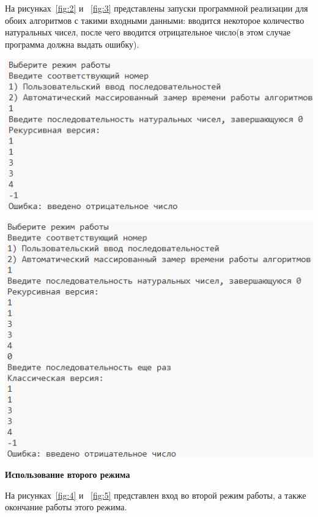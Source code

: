 \documentclass[14pt]{article}
\begin{document}
	На рисунках~\ref{fig:2} и ~\ref{fig:3} представлены запуски программной реализации для обоих алгоритмов с такими входными данными: вводится некоторое количество натуральных чисел, после чего вводится отрицательное число(в этом случае программа должна выдать ошибку).
	\begin{center}
		\includegraphics{example_2.png}
		\label{fig:2}
	\end{center}
	\begin{center}
		\includegraphics{example_3.png}
		\label{fig:3}
	\end{center}
	\textbf{Использование второго режима} \par
	На рисунках~\ref{fig:4} и ~\ref{fig:5} представлен вход во второй режим работы, а также окончание работы этого режима.
\end{document}
